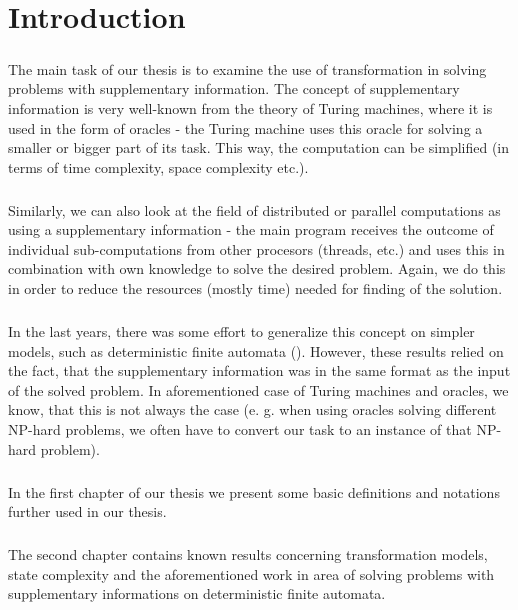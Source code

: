 \chapter*{Introduction}
\paragraph{}
The main task of our thesis is to examine the use of transformation in solving problems with supplementary information. The concept of supplementary information is very well-known from the theory of Turing machines, where it is used in the form of oracles - the Turing machine uses this oracle for solving a smaller or bigger part of its task. This way, the computation can be simplified (in terms of time complexity, space complexity etc.).

\paragraph{}
Similarly, we can also look at the field of distributed or parallel computations as using a supplementary information - the main program receives the outcome of individual sub-computations from other procesors (threads, etc.) and uses this in combination with own knowledge to solve the desired problem. Again, we do this in order to reduce the resources (mostly time) needed for finding of the solution.

\paragraph{}
In the last years, there was some effort to generalize this concept on simpler models, such as deterministic finite automata (\cite{Gazi}). However, these results relied on the fact, that the supplementary information was in the same format as the input of the solved problem. In aforementioned case of Turing machines and oracles, we know, that this is not always the case (e. g. when using oracles solving different NP-hard problems, we often have to convert our task to an instance of that NP-hard problem).

\paragraph{}
In the first chapter of our thesis we present some basic definitions and notations further used in our thesis.

\paragraph{}
The second chapter contains known results concerning transformation models, state complexity and the aforementioned work in area of solving problems with supplementary informations on deterministic finite automata.

